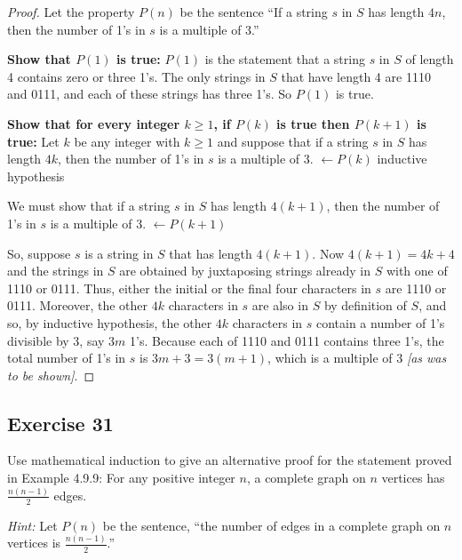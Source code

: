 \documentclass[14pt]{extarticle}
\newcommand{\from}{\leftarrow}
\newcommand{\cy}{\color{cyan}}
\begin{document}
\begin{proof}
    Let the property $P(n)$ be the sentence “If a string $s$ in $S$ has length $4n$, then the number of 1’s in $s$ is a multiple of 3.”

    {\bf Show that $P(1)$ is true:} $P(1)$ is the statement that a string $s$ in $S$ of length 4 contains zero or three  1’s. The only strings in $S$ that have length 4 are 1110 and 0111, and each of these strings has three 1’s. So $P(1)$ is true.

        {\bf Show that for every integer $k \geq 1$, if $P(k)$ is true then $P(k + 1)$ is true:} Let $k$ be any integer with $k \geq 1$ and suppose that if a string $s$ in $S$ has length $4k$, then the number of 1’s in $s$ is a multiple of 3. {\cy $\from P(k)$ inductive hypothesis}

    We must show that if a string $s$ in $S$ has length $4(k + 1)$, then the number of 1’s in $s$ is a multiple of 3. {\cy $\from P(k + 1)$}

    So, suppose $s$ is a string in $S$ that has length $4(k + 1)$. Now $4(k + 1) = 4k + 4$ and the strings in $S$ are obtained by juxtaposing strings already in $S$ with one of 1110 or 0111. Thus, either the initial or the final four characters in $s$ are 1110 or 0111. Moreover, the other $4k$ characters in $s$ are also in $S$ by definition of $S$, and so, by inductive hypothesis, the other $4k$ characters in $s$ contain a number of 1's divisible by 3, say $3m$ 1’s. Because each of 1110 and 0111 contains three 1’s, the total number of 1’s in $s$ is $3m + 3 = 3(m+1)$, which is a multiple of 3 {\it [as was to be shown]}.
\end{proof}

\subsection{Exercise 31}
Use mathematical induction to give an alternative proof for the statement proved in Example 4.9.9: For any positive integer $n$, a complete graph on $n$ vertices has $\frac{n(n - 1)}{2}$ edges.

    {\it Hint:} Let $P(n)$ be the sentence, ``the number of edges in a complete graph on $n$ vertices is $\frac{n(n - 1)}{2}$.''
\end{document}
